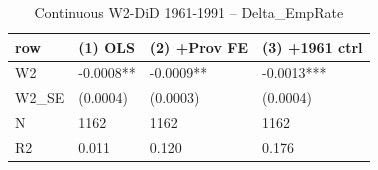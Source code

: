 \begin{table}

\caption{Continuous W2-DiD 1961-1991 -- Delta_EmpRate}
\centering
\begin{tabular}[t]{llll}
\toprule
row & (1) OLS & (2) +Prov FE & (3) +1961 ctrl\\
\midrule
W2 & -0.0008** & -0.0009** & -0.0013***\\
W2\_SE & (0.0004) & (0.0003) & (0.0004)\\
N & 1162 & 1162 & 1162\\
R2 & 0.011 & 0.120 & 0.176\\
\bottomrule
\end{tabular}
\end{table}
